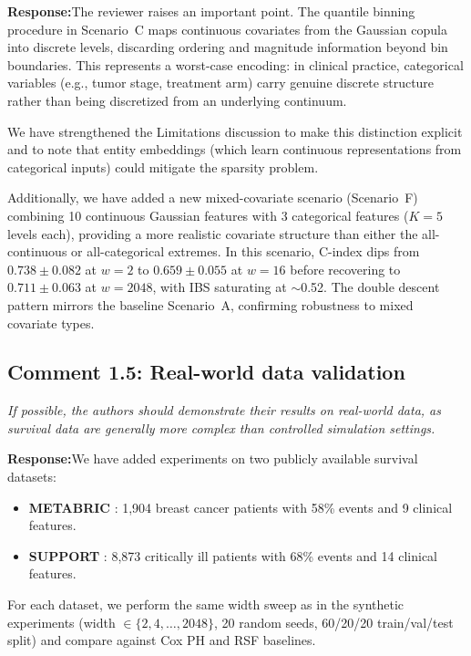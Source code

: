 \documentclass[12pt,a4paper]{article}
\newcommand{\comment}[1]{%
  \begin{reviewerbox}
    \textit{#1}
  \end{reviewerbox}
}
\newcommand{\response}{\noindent\textbf{Response:}\quad}
\begin{document}
\response The reviewer raises an important point. The quantile binning
procedure in Scenario~C maps continuous covariates from the Gaussian copula
into discrete levels, discarding ordering and magnitude information beyond
bin boundaries. This represents a worst-case encoding: in clinical practice,
categorical variables (e.g., tumor stage, treatment arm) carry genuine
discrete structure rather than being discretized from an underlying continuum.

We have strengthened the Limitations discussion to make this distinction
explicit and to note that entity embeddings (which learn continuous
representations from categorical inputs) could mitigate the sparsity problem.

Additionally, we have added a new mixed-covariate scenario (Scenario~F)
combining 10 continuous Gaussian features with 3 categorical features
($K = 5$ levels each), providing a more realistic covariate structure than
either the all-continuous or all-categorical extremes. In this scenario,
C-index dips from $0.738 \pm 0.082$ at $w = 2$ to $0.659 \pm 0.055$ at
$w = 16$ before recovering to $0.711 \pm 0.063$ at $w = 2048$, with IBS
saturating at $\sim$0.52. The double descent pattern mirrors the baseline
Scenario~A, confirming robustness to mixed covariate types.


\bigskip

\subsection*{Comment 1.5: Real-world data validation}

\comment{If possible, the authors should demonstrate their results on real-world data, as survival data are generally more complex than controlled simulation settings.}

\response We have added experiments on two publicly available survival
datasets:

\begin{itemize}
\item \textbf{METABRIC} \citep{curtis2012genomic}: 1,904
breast cancer patients with 58\% events and 9 clinical features.

\item \textbf{SUPPORT} \citep{knaus1995support}: 8,873
critically ill patients with 68\% events and 14 clinical features.
\end{itemize}

For each dataset, we perform the same width sweep as in the synthetic
experiments (width $\in \{2, 4, \ldots, 2048\}$, 20 random seeds, 60/20/20
train/val/test split) and compare against Cox PH and RSF baselines.
\end{document}
